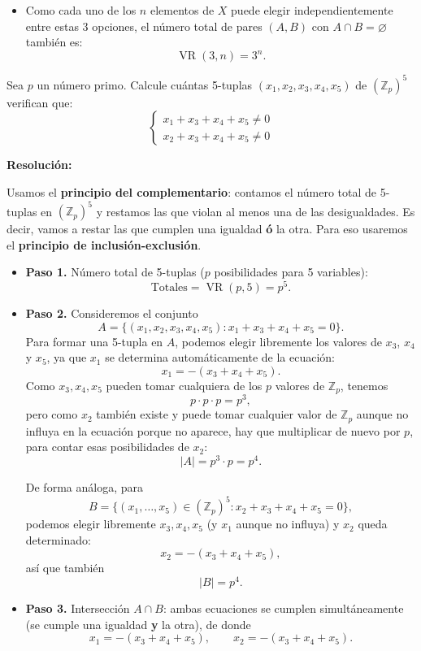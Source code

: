 \documentclass[a4paper,12pt]{article}
\begin{document}
\begin{ejercicio}[title=Ejercicio 24 (⋆)]
\begin{itemize}
\item Como cada uno de los $n$ elementos de $X$ puede elegir independientemente entre estas 3 opciones, el número total de pares $(A,B)$ con $A\cap B = \varnothing$ también es:
\[
\operatorname{VR}(3,n)=\boxed{3^n}.
\]
\end{itemize}
\end{ejercicio}

\begin{ejercicio}[title=Ejercicio 29]
Sea $p$ un número primo. Calcule cuántas 5-tuplas $(x_1, x_2, x_3, x_4, x_5)$ de $(\mathbb{Z}_p)^5$ verifican que:
\[
\begin{cases}
x_1 + x_3 + x_4 + x_5 \ne 0 \\
x_2 + x_3 + x_4 + x_5 \ne 0
\end{cases}
\]

\tcblower
\textbf{Resolución:}

Usamos el \textbf{principio del complementario}: contamos el número total de 5-tuplas en $(\mathbb{Z}_p)^5$ y restamos las que violan al menos una de las desigualdades. Es decir, vamos a restar las que cumplen una igualdad \textbf{ó} la otra. Para eso usaremos el \textbf{principio de inclusión-exclusión}.

\begin{itemize}
 \item[] \textbf{Paso 1.} Número total de 5-tuplas ($p$ posibilidades para 5 variables):
 \[
 \text{Totales}=\operatorname{VR}(p,5) = p^5.
 \]

 \item[] \textbf{Paso 2.} Consideremos el conjunto
 \[
 A=\{(x_1,x_2,x_3,x_4,x_5) : x_1 + x_3 + x_4 + x_5 = 0\}.
 \]
 Para formar una 5-tupla en $A$, podemos elegir libremente los valores de $x_3$, $x_4$ y $x_5$, ya que $x_1$ se determina automáticamente de la ecuación:
 \[
 x_1 = -(x_3+x_4+x_5).
 \]
 Como $x_3, x_4, x_5$ pueden tomar cualquiera de los $p$ valores de $\mathbb{Z}_p$, tenemos
 \[
 p \cdot p \cdot p = p^3,
 \]
 pero como $x_2$ también existe y puede tomar cualquier valor de $\mathbb{Z}_p$ aunque no influya en la ecuación porque no aparece, hay que multiplicar de nuevo por $p$, para contar esas posibilidades de $x_2$:
 \[
 |A| = p^3 \cdot p = p^4.
 \]

 De forma análoga, para
 \[
 B=\{(x_1,\dots,x_5)\in (\mathbb{Z}_p)^5 : x_2 + x_3 + x_4 + x_5 = 0\},
 \]
 podemos elegir libremente $x_3, x_4, x_5$ (y $x_1$ aunque no influya) y $x_2$ queda determinado:
 \[
 x_2 = -(x_3+x_4+x_5),
 \]
así que también
 \[
 |B|=p^4.
 \]

 \item[] \textbf{Paso 3.} Intersección $A\cap B$: ambas ecuaciones se cumplen simultáneamente (se cumple una igualdad \textbf{y} la otra), de donde
 \[
 x_1=-(x_3+x_4+x_5),\qquad x_2=-(x_3+x_4+x_5).
 \]
 \end{itemize}
 \end{ejercicio}
\end{document}
